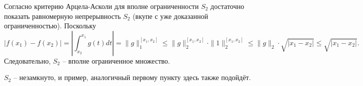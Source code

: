 \begin{solve}
\begin{enumerate}
        Согласно критерию Арцела-Асколи для вполне ограниченности $S_2$ достаточно показать равномерную непрерывность $S_2$ (вкупе с уже доказанной ограниченностью). Поскольку
        \[
            |f(x_1) - f(x_2)| = \left|\int_{x_2}^{x_1} g(t)dt\right| = \|g\|_1^{[x_1, x_2]} \leq \|g\|_2^{[x_1, x_2]} \cdot \|1\|_2^{[x_1, x_2]} \leq \|g\|_2 \cdot \sqrt{|x_1 - x_2|} \leq \sqrt{|x_1 - x_2|}.
        \]
        Следовательно, $S_2$ -- вполне ограниченное множество.

        $S_2$ -- незамкнуто, и пример, аналогичный первому пункту здесь также подойдёт.
    \end{enumerate}
\end{solve}